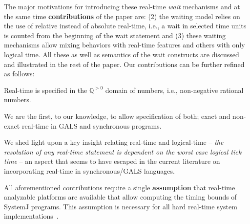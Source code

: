 


The major motivations for introducing these real-time \textit{wait}
mechanisms and at the same time \textbf{contributions} of the paper are:
 (2) the waiting
model relies on the use of relative instead of absolute real-time, i.e.,
a wait in selected time units is counted from the beginning of the wait
statement and (3) these waiting mechanisms allow mixing behaviors with
real-time features and others with only logical time. All these as well
as semantics of the wait constructs are discussed and illustrated in the
rest of the paper. Our contributions can be further refined as follows:

\begin{enumerate*}
\item Real-time is specified in the $\mathbb{Q}^{>0}$ domain of numbers,
  i.e., non-negative rational numbers.
\item We are the first, to our knowledge, to allow specification of
  both; exact and non-exact real-time in GALS and synchronous programs.
\item We shed light upon a key insight relating real-time and
  logical-time -- \textit{the resolution of any real-time statement is
    dependent on the worst case logical tick time} -- an aspect that
  seems to have escaped in the current literature on incorporating
  real-time in synchronous/GALS languages.
\end{enumerate*}

All aforementioned contributions require a single \textbf{assumption}
that real-time analyzable platforms are available that allow computing
the timing bounds of SystemJ programs. This assumption is necessary for
all hard real-time system implementations~\cite{wilhelm08}.

